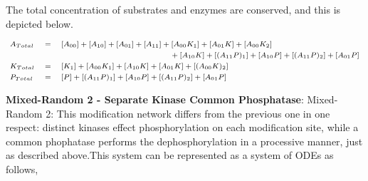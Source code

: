 \documentclass[9pt,lineno]{elife}
\begin{document}
\begin{appendixbox}
The total concentration of substrates and enzymes are conserved, and this is depicted below.

\begin{equation}
\scriptsize{    \begin{alignedat}{3}
        & A_{Total} \quad &&= \quad [A_{00}]+[A_{10}]+[A_{01}]+[A_{11}]+[A_{00}K_{1}]+[A_{01}K]+[A_{00}K_{2}] && \\
        & && \hspace{45mm} +[A_{10}K]+[(A_{11}P)_1]+[A_{10}P]+[(A_{11}P)_2]+[A_{01}P] && \\
        & K_{Total} \quad &&= \quad [K_1] + [A_{00}K_{1}] + [A_{10}K] + [A_{01}K] + [(A_{00}K)_2] && \\
        & P_{Total} \quad &&= \quad [P] + [(A_{11}P)_1] + [A_{10}P] + [(A_{11}P)_2] + [A_{01}P] && \\
    \end{alignedat}}
\end{equation}

\textbf{Mixed-Random 2 - Separate Kinase Common Phosphatase}: Mixed-Random 2: This modification network differs from the previous one in one respect: distinct kinases effect phosphorylation on each modification site, while a common phophatase performs the dephosphorylation in a processive manner, just as described above.This system can be represented as a system of ODEs as follows, 


\end{appendixbox}
\end{document}
